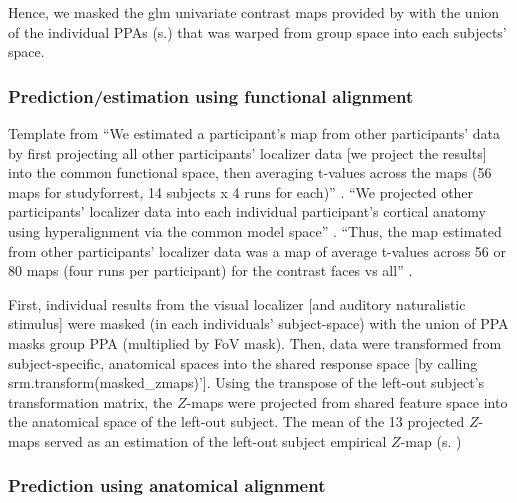 Hence, we masked the \ac{glm} univariate contrast maps provided by
\citet{sengupta2016extensiondata} with the union of the individual PPAs
(s.\citep{haeusler2022processing}) that was warped from group space into each
subjects' space.


\subsubsection{Prediction/estimation using functional alignment}

Template from \citet{jiahui2020predicting} ``We estimated a participant's map
from other participants' data by first projecting all other participants'
localizer data [we project the results] into the common functional space, then
averaging t-values across the maps (56 maps for studyforrest, 14 subjects x 4
runs for each)'' \citep{jiahui2020predicting}.
%
``We projected other participants' localizer data into each individual
participant's cortical anatomy using hyperalignment via the common model space''
\citep{jiahui2020predicting}.
%
``Thus, the map estimated from other participants' localizer data was a map of
average t-values across 56 or 80 maps (four runs per participant) for the
contrast faces vs all'' \citep{jiahui2020predicting}.

%
First, individual results from the visual localizer [and auditory naturalistic
stimulus] were masked (in each individuals' subject-space) with the union of PPA
masks group PPA (multiplied by FoV mask).
%
Then, data were transformed from subject-specific, anatomical spaces into the
shared response space [by calling srm.transform(masked\_zmaps)'].
%
Using the transpose of the left-out subject's transformation matrix, the
$Z$-maps were projected from shared feature space into the anatomical space of
the left-out subject.
%
The mean of the 13 projected $Z$-maps served as an estimation of the left-out
subject empirical $Z$-map (s. \citep{sengupta2016extension})


\subsubsection{Prediction using anatomical alignment}



